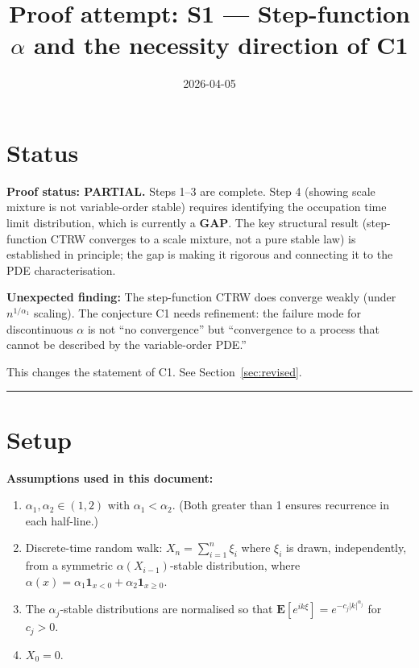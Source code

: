 \documentclass{amsart}
\title{Proof attempt: S1 --- Step-function $\alpha$ and the necessity direction of C1}
\date{2026-04-05}
\theoremstyle{definition}
\begin{document}
\maketitle

\section*{Status}

\textbf{Proof status: PARTIAL.}
Steps 1--3 are complete. Step 4 (showing scale mixture is not variable-order stable)
requires identifying the occupation time limit distribution, which is currently
a \textbf{GAP}. The key structural result (step-function CTRW converges to a
scale mixture, not a pure stable law) is established in principle; the gap is
making it rigorous and connecting it to the PDE characterisation.

\textbf{Unexpected finding:} The step-function CTRW does converge weakly (under
$n^{1/\alpha_1}$ scaling). The conjecture C1 needs refinement: the failure mode
for discontinuous $\alpha$ is not ``no convergence'' but ``convergence to a process
that cannot be described by the variable-order PDE.''

This changes the statement of C1. See Section~\ref{sec:revised}.

\bigskip\hrule\bigskip

\section{Setup}

\textbf{Assumptions used in this document:}
\begin{enumerate}
    \item[(A1)] $\alpha_1, \alpha_2 \in (1, 2)$ with $\alpha_1 < \alpha_2$.
                (Both greater than 1 ensures recurrence in each half-line.)
    \item[(A2)] Discrete-time random walk: $X_n = \sum_{i=1}^n \xi_i$ where
                $\xi_i$ is drawn, independently, from a symmetric $\alpha(X_{i-1})$-stable
                distribution, where $\alpha(x) = \alpha_1 \mathbf{1}_{x < 0} +
                \alpha_2 \mathbf{1}_{x \geq 0}$.
    \item[(A3)] The $\alpha_j$-stable distributions are normalised so that
                $\mathbf{E}[e^{ik\xi}] = e^{-c_j|k|^{\alpha_j}}$ for $c_j > 0$.
    \item[(A4)] $X_0 = 0$.
\end{enumerate}
\end{document}
